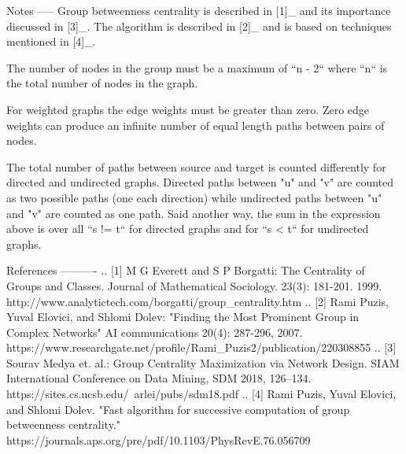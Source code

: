 \begin{DoxyVerb}
Notes
-----
Group betweenness centrality is described in [1]_ and its importance discussed in [3]_.
The algorithm is described in [2]_ and is based on techniques mentioned in [4]_.

The number of nodes in the group must be a maximum of ``n - 2`` where ``n``
is the total number of nodes in the graph.

For weighted graphs the edge weights must be greater than zero.
Zero edge weights can produce an infinite number of equal length
paths between pairs of nodes.

The total number of paths between source and target is counted
differently for directed and undirected graphs. Directed paths
between "u" and "v" are counted as two possible paths (one each
direction) while undirected paths between "u" and "v" are counted
as one path. Said another way, the sum in the expression above is
over all ``s != t`` for directed graphs and for ``s < t`` for undirected graphs.

References
----------
.. [1] M G Everett and S P Borgatti:
   The Centrality of Groups and Classes.
   Journal of Mathematical Sociology. 23(3): 181-201. 1999.
   http://www.analytictech.com/borgatti/group_centrality.htm
.. [2] Rami Puzis, Yuval Elovici, and Shlomi Dolev:
   "Finding the Most Prominent Group in Complex Networks"
   AI communications 20(4): 287-296, 2007.
   https://www.researchgate.net/profile/Rami_Puzis2/publication/220308855
.. [3] Sourav Medya et. al.:
   Group Centrality Maximization via Network Design.
   SIAM International Conference on Data Mining, SDM 2018, 126–134.
   https://sites.cs.ucsb.edu/~arlei/pubs/sdm18.pdf
.. [4] Rami Puzis, Yuval Elovici, and Shlomi Dolev.
   "Fast algorithm for successive computation of group betweenness centrality."
   https://journals.aps.org/pre/pdf/10.1103/PhysRevE.76.056709
\end{DoxyVerb}
 